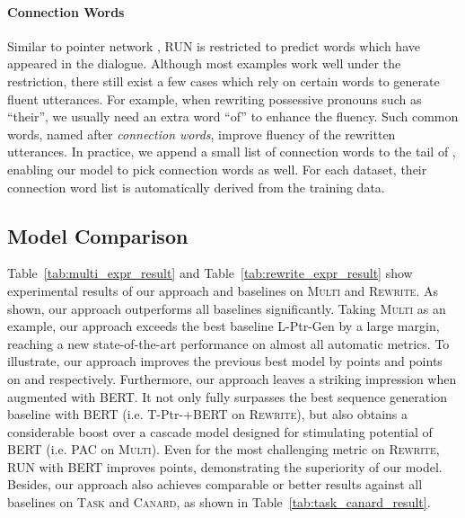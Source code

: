 \documentclass[11pt,a4paper]{article}
\begin{document}
\paragraph{Connection Words} Similar to pointer network \cite{oriol-2015-pointer}, RUN is restricted to predict words which have appeared in the dialogue. Although most examples work well under the restriction, there still exist a few cases which rely on certain words to generate fluent utterances. For example, when rewriting possessive pronouns such as ``their'', we usually need an extra word ``of'' to enhance the fluency. Such common words, named after \textit{connection words}, improve fluency of the rewritten utterances. In practice, we append a small list of connection words to the tail of , enabling our model to pick connection words as well. For each dataset, their connection word list is automatically derived from the training data. 


\subsection{Model Comparison}

Table~\ref{tab:multi_expr_result} and Table~\ref{tab:rewrite_expr_result} show experimental results of our approach and baselines on \textsc{Multi} and \textsc{Rewrite}. As shown, our approach outperforms all baselines significantly. Taking \textsc{Multi} as an example, our approach exceeds the best baseline L-Ptr-Gen by a large margin, reaching a new state-of-the-art performance on almost all automatic metrics. To illustrate, our approach improves the previous best model by  points and  points on  and  respectively. Furthermore, our approach leaves a striking impression when augmented with BERT. It not only fully surpasses the best sequence generation baseline with BERT (i.e. T-Ptr-+BERT on \textsc{Rewrite}), but also obtains a considerable boost over a cascade model designed for stimulating potential of BERT (i.e. PAC on \textsc{Multi}). Even for the most challenging metric  on \textsc{Rewrite}, RUN with BERT improves  points, demonstrating the superiority of our model.
Besides, our approach also achieves comparable or better results against all baselines on \textsc{Task} and \textsc{Canard}, as shown in Table~\ref{tab:task_canard_result}. 

\begin{table}[t]
    \centering
    \caption{Human rating evaluations about the response quality on sampled  dialogues from the development set of \textsc{Multi}. The score ranges from  to . ``NR'' represents the proportion of rewritten utterances which are equal to current utterances.}
    \label{tab:human_eval_response_quality}
\end{table}
\end{document}
